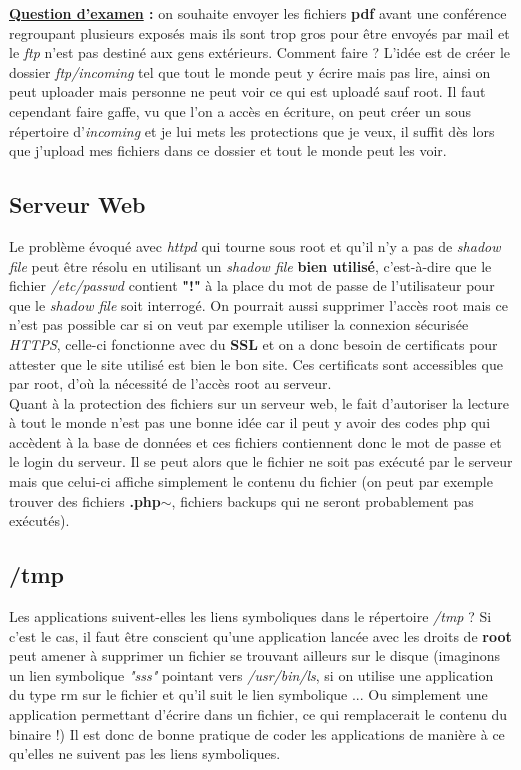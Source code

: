 \documentclass{article}
\newcommand{\titre}[1]{\textcolor{title}{#1}}
\newcommand{\tssect}[1]{\titre{\subsection{#1}}}
\newcommand{\term}[1]{\textit{\textcolor{maintitle}{#1}}}
\begin{document}
\begin{sffamily}
\noindent\textbf{\underline{Question d'examen} :} on souhaite envoyer les fichiers \textbf{pdf} avant une conférence 
regroupant plusieurs exposés mais ils sont trop gros pour être envoyés par mail et le \term{ftp} n'est pas destiné aux 
gens extérieurs. Comment faire ? L'idée est de créer le dossier \textit{ftp/incoming} tel que tout le monde peut y 
écrire mais pas lire, ainsi on peut uploader mais personne ne peut voir ce qui est uploadé sauf root. Il faut cependant 
faire gaffe, vu que l'on a accès en écriture, on peut créer un sous répertoire d'\textit{incoming} et je lui mets les
protections que je veux, il suffit dès lors que j'upload mes fichiers dans ce dossier et tout le monde peut les voir.

\tssect{Serveur Web}

Le problème évoqué avec \term{httpd} qui tourne sous root et qu'il n'y a pas de \term{shadow file} peut être résolu en 
utilisant un \term{shadow file} \textbf{bien utilisé}, c'est-à-dire que le fichier \textit{/etc/passwd} contient 
\textbf{"!"} à la place du mot de passe de l'utilisateur pour que le \term{shadow file} soit interrogé. On pourrait 
aussi supprimer l'accès root mais ce n'est pas possible car si on veut par exemple utiliser la connexion sécurisée 
\term{HTTPS}, celle-ci fonctionne avec du \textbf{SSL} et on a donc besoin de certificats pour attester que le site 
utilisé est bien le bon site. Ces certificats sont accessibles que par root, d'où la nécessité de l'accès root au 
serveur. \\

\noindent Quant à la protection des fichiers sur un serveur web, le fait d'autoriser la lecture à tout le monde n'est 
pas une bonne idée car il peut y avoir des codes php qui accèdent à la base de données et ces fichiers contiennent donc 
le mot de passe et le login du serveur. Il se peut alors que le fichier ne soit pas exécuté par le serveur mais que 
celui-ci affiche simplement le contenu du fichier (on peut par exemple trouver des fichiers \textbf{.php$\sim$}, 
fichiers backups qui ne seront probablement pas exécutés).

\tssect{/tmp}

Les applications suivent-elles les liens symboliques dans le répertoire \textit{/tmp} ? Si c'est le cas, il 
faut être conscient qu'une application lancée avec les droits de \textbf{root} peut amener à supprimer un fichier se 
trouvant ailleurs sur le disque (imaginons un lien symbolique \textit{"sss"} pointant vers \textit{/usr/bin/ls}, si on 
utilise une application du type rm sur le fichier et qu'il suit le lien symbolique ... Ou simplement une application 
permettant d'écrire dans un fichier, ce qui remplacerait le contenu du binaire !) Il est donc de bonne pratique de 
coder les applications de manière à ce qu'elles ne suivent pas les liens symboliques. 


\end{sffamily}
\end{document}
